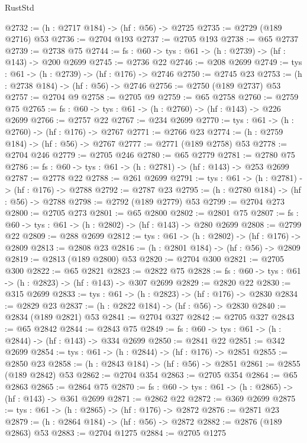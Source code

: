 \begin{lexlean}{RustStd}
\begin{coremodule}
{\begin{coremodule}
{{{{{{{{{{{{{{{{{{{{{@2732 := (h : @2717 @184) -> (hf : @56) -> @2725
@2735 := @2729 (@189 @2716) @53
@2736 := @2704 @193
@2737 := @2705 @193
@2738 := @65 @2737
@2739 := @2738 @75
@2744 := {fs : @60} -> {tys : @61} -> (h : @2739) -> (hf : @143) -> @200 @2699
@2745 := @2736 @22
@2746 := @208 @2699
@2749 := {tys : @61} -> (h : @2739) -> (hf : @176) -> @2746
@2750 := @2745 @23
@2753 := (h : @2738 @184) -> (hf : @56) -> @2746
@2756 := @2750 (@189 @2737) @53
@2757 := @2704 @9
@2758 := @2705 @9
@2759 := @65 @2758
@2760 := @2759 @75
@2765 := {fs : @60} -> {tys : @61} -> (h : @2760) -> (hf : @143) -> @226 @2699
@2766 := @2757 @22
@2767 := @234 @2699
@2770 := {tys : @61} -> (h : @2760) -> (hf : @176) -> @2767
@2771 := @2766 @23
@2774 := (h : @2759 @184) -> (hf : @56) -> @2767
@2777 := @2771 (@189 @2758) @53
@2778 := @2704 @246
@2779 := @2705 @246
@2780 := @65 @2779
@2781 := @2780 @75
@2786 := {fs : @60} -> {tys : @61} -> (h : @2781) -> (hf : @143) -> @253 @2699
@2787 := @2778 @22
@2788 := @261 @2699
@2791 := {tys : @61} -> (h : @2781) -> (hf : @176) -> @2788
@2792 := @2787 @23
@2795 := (h : @2780 @184) -> (hf : @56) -> @2788
@2798 := @2792 (@189 @2779) @53
@2799 := @2704 @273
@2800 := @2705 @273
@2801 := @65 @2800
@2802 := @2801 @75
@2807 := {fs : @60} -> {tys : @61} -> (h : @2802) -> (hf : @143) -> @280 @2699
@2808 := @2799 @22
@2809 := @288 @2699
@2812 := {tys : @61} -> (h : @2802) -> (hf : @176) -> @2809
@2813 := @2808 @23
@2816 := (h : @2801 @184) -> (hf : @56) -> @2809
@2819 := @2813 (@189 @2800) @53
@2820 := @2704 @300
@2821 := @2705 @300
@2822 := @65 @2821
@2823 := @2822 @75
@2828 := {fs : @60} -> {tys : @61} -> (h : @2823) -> (hf : @143) -> @307 @2699
@2829 := @2820 @22
@2830 := @315 @2699
@2833 := {tys : @61} -> (h : @2823) -> (hf : @176) -> @2830
@2834 := @2829 @23
@2837 := (h : @2822 @184) -> (hf : @56) -> @2830
@2840 := @2834 (@189 @2821) @53
@2841 := @2704 @327
@2842 := @2705 @327
@2843 := @65 @2842
@2844 := @2843 @75
@2849 := {fs : @60} -> {tys : @61} -> (h : @2844) -> (hf : @143) -> @334 @2699
@2850 := @2841 @22
@2851 := @342 @2699
@2854 := {tys : @61} -> (h : @2844) -> (hf : @176) -> @2851
@2855 := @2850 @23
@2858 := (h : @2843 @184) -> (hf : @56) -> @2851
@2861 := @2855 (@189 @2842) @53
@2862 := @2704 @354
@2863 := @2705 @354
@2864 := @65 @2863
@2865 := @2864 @75
@2870 := {fs : @60} -> {tys : @61} -> (h : @2865) -> (hf : @143) -> @361 @2699
@2871 := @2862 @22
@2872 := @369 @2699
@2875 := {tys : @61} -> (h : @2865) -> (hf : @176) -> @2872
@2876 := @2871 @23
@2879 := (h : @2864 @184) -> (hf : @56) -> @2872
@2882 := @2876 (@189 @2863) @53
@2883 := @2704 @1275
@2884 := @2705 @1275
}}}}}}}}}}}}}}}}}}}}}
\end{coremodule}}
\end{coremodule}
\end{lexlean}
